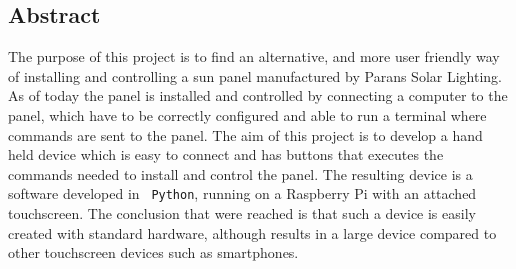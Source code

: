 \documentclass[a4paper]{article}
\begin{document}
    \subsection*{Abstract} %
    \label{sub:abstract}
            The purpose of this project is to find an alternative, and more 
            user friendly way of installing and controlling a sun panel 
            manufactured by Parans Solar Lighting. As of today the panel is 
            installed and controlled by connecting a computer to the panel, 
            which have to be correctly configured and able to run a terminal 
            where commands are sent to the panel. The aim of this project is 
            to develop a hand held device which is easy to connect and has 
            buttons that executes the commands needed to install and control 
            the panel. The resulting device is a software developed in \texttt{
            Python}, running on a Raspberry Pi with an attached touchscreen.  
            The conclusion that were reached is that such a device is easily 
            created with standard hardware, although results in a large device 
            compared to other touchscreen devices such as smartphones.
            
\end{document}
